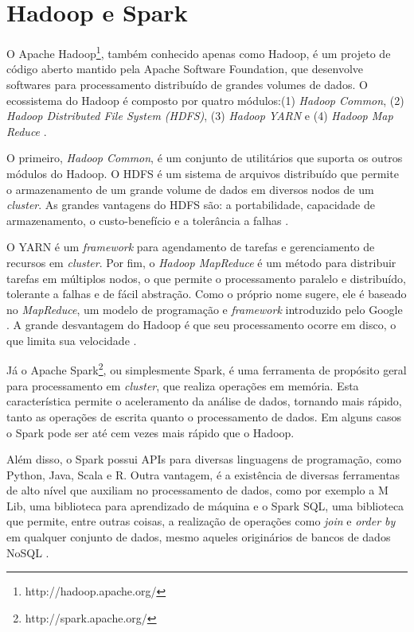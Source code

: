 \section{Hadoop e Spark}
\label{sec:spark}

O Apache Hadoop\footnote{http://hadoop.apache.org/}, também conhecido apenas como Hadoop, 
é um projeto de código aberto mantido pela Apache Software Foundation, que desenvolve 
softwares para processamento distribuído de grandes volumes de dados. O ecossistema do 
Hadoop é composto por quatro módulos:(1) \textit{Hadoop Common}, (2) 
\textit{Hadoop Distributed File System (HDFS)}, (3) \textit{Hadoop YARN} e (4) 
\textit{Hadoop Map Reduce} \cite{kumar2014apache}. 

O primeiro, \textit{Hadoop Common}, é um conjunto de utilitários que suporta os outros módulos
do Hadoop. O HDFS é um sistema de arquivos distribuído que permite o armazenamento de um 
grande volume de dados em diversos nodos de um \textit{cluster}. As grandes vantagens do HDFS 
são: a portabilidade, capacidade de armazenamento, o custo-benefício e a tolerância a falhas 
\cite{kumar2014apache}.

O YARN é um \textit{framework} para agendamento de tarefas e gerenciamento de recursos em 
\textit{cluster}. Por fim, o \textit{Hadoop MapReduce} é um método para distribuir tarefas 
em múltiplos nodos, o que permite o processamento paralelo e distribuído, tolerante a 
falhas e de fácil abstração. Como o próprio nome sugere, ele é baseado no \textit{MapReduce}, 
um modelo de programação e \textit{framework} introduzido pelo Google \cite{kumar2014apache}. 
A grande desvantagem do Hadoop é que seu processamento ocorre em disco, o que limita sua 
velocidade \cite{shoro2015big}.

Já o Apache Spark\footnote{http://spark.apache.org/}, ou simplesmente Spark, é uma ferramenta 
de propósito geral para processamento em \textit{cluster}, que realiza operações em memória. 
Esta característica permite o aceleramento da análise de dados, tornando mais rápido, 
tanto as operações de escrita quanto o processamento de dados. Em alguns casos o Spark pode ser 
até cem vezes mais rápido que o Hadoop. 

Além disso, o Spark possui APIs para diversas linguagens de programação, como Python, Java, 
Scala e R. Outra vantagem, é a existência de diversas ferramentas de alto nível que auxiliam 
no processamento de dados, como por exemplo a M Lib, uma biblioteca para aprendizado de 
máquina e o Spark SQL, uma biblioteca que permite, entre outras coisas, a realização de 
operações como \textit{join} e \textit{order by} em qualquer conjunto de dados, mesmo 
aqueles originários de bancos de dados NoSQL \cite{shoro2015big}.

